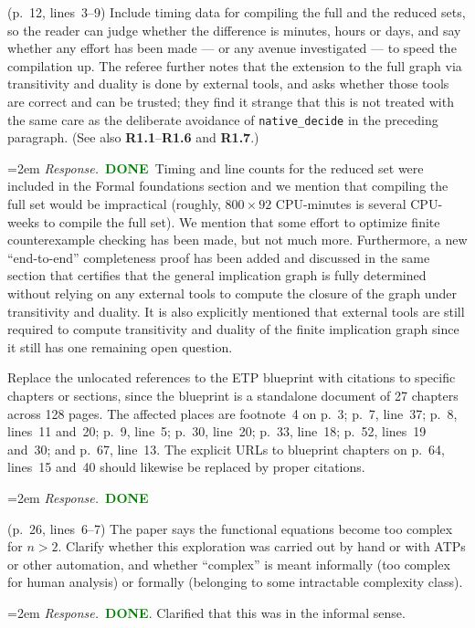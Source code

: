 \documentclass[11pt]{amsart}
\newcommand{\done}{\textcolor{green}{\textbf{DONE}}}
\newcommand{\response}[1]{%
  \par\smallskip
  \noindent\hangindent=2em\hangafter=1
  \textit{Response.}\ #1
  \par\smallskip}
\begin{document}
\begin{requests}
\item (p.~12, lines~3--9) Include timing data for compiling the full and the reduced
sets, so the reader can judge whether the difference is minutes, hours or days, and
say whether any effort has been made --- or any avenue investigated --- to speed the
compilation up. The referee further notes that the extension to the full graph via
transitivity and duality is done by external tools, and asks whether those tools are
correct and can be trusted; they find it strange that this is not treated with the same
care as the deliberate avoidance of \texttt{native\_decide} in the preceding paragraph.
(See also \textbf{R1.1}--\textbf{R1.6} and \textbf{R1.7}.)
\response{\done\ Timing and line counts for the reduced set were included in the Formal foundations section and we mention that compiling the full set would be impractical (roughly, $800 \times 92$ CPU-minutes is several CPU-weeks to compile the full set). We mention that some effort to optimize finite counterexample checking has been made, but not much more. Furthermore, a new ``end-to-end'' completeness proof has been added and discussed in the same section that certifies that the general implication graph is fully determined without relying on any external tools to compute the closure of the graph under transitivity and duality. It is also explicitly mentioned that external tools are still required to compute transitivity and duality of the finite implication graph since it still has one remaining open question.}

\item Replace the unlocated references to the ETP blueprint with citations to specific
chapters or sections, since the blueprint is a standalone document of 27 chapters
across 128 pages. The affected places are footnote~4 on p.~3; p.~7, line~37; p.~8,
lines~11 and~20; p.~9, line~5; p.~30, line~20; p.~33, line~18; p.~52, lines~19 and~30;
and p.~67, line~13. The explicit URLs to blueprint chapters on p.~64, lines~15 and~40
should likewise be replaced by proper citations.
\response{\done}

\item (p.~26, lines~6--7) The paper says the functional equations become too complex
for \(n > 2\). Clarify whether this exploration was carried out by hand or with ATPs or
other automation, and whether ``complex'' is meant informally (too complex for human
analysis) or formally (belonging to some intractable complexity class).
\response{\done. Clarified that this was in the informal sense.}


\end{requests}
\end{document}
